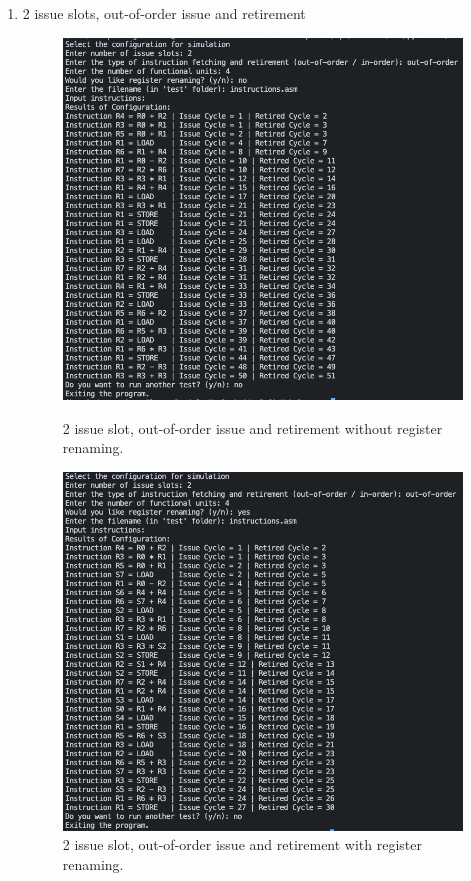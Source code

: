 \documentclass{article}
\begin{document}
\begin{enumerate}
    \item 2 issue slots, out-of-order issue and retirement 
    \begin{figure}[H]
        \centering 
        \begin{minipage}[t]{0.45\textwidth}
            \centering
            \includegraphics[width=\textwidth]{Images/Config4.png}
            \caption{2 issue slot, out-of-order issue and retirement without register renaming.}
        \end{minipage}
        \hfill
        \begin{minipage}[t]{0.45\textwidth}
            \centering 
            \includegraphics[width=\textwidth]{Images/Config4_Renaming.png}
            \caption{2 issue slot, out-of-order issue and retirement with register renaming.}
        \end{minipage}
    \end{figure}


\end{enumerate}
\end{document}
